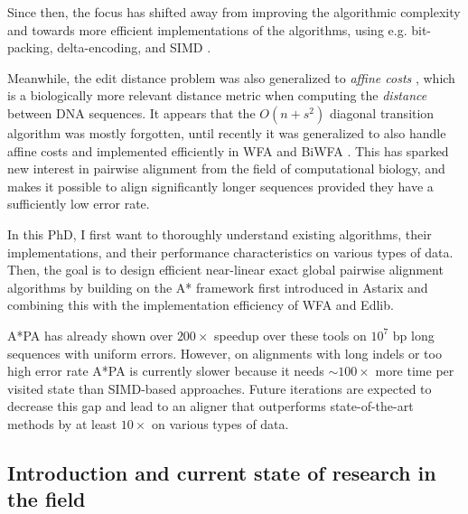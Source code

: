 \documentclass[11pt,english,a4paper]{article}
\begin{document}
Since then, the focus has shifted away from improving the algorithmic complexity
and towards more efficient implementations of the algorithms, using e.g.
bit-packing, delta-encoding, and SIMD
\autocite{myers99,edlib,suzuki-kasahara}.

Meanwhile, the edit distance problem was also generalized to \emph{affine costs}
\autocite{gotoh}, which is a biologically more relevant distance metric when
computing the \emph{distance} between DNA sequences.
It appears that the \(O(n+s^2)\) diagonal transition algorithm was
mostly forgotten, until recently it was generalized to also handle affine costs
and implemented efficiently in WFA and BiWFA \autocite{wfa,biwfa}.
This has sparked new interest in pairwise alignment from the field of
computational biology, and makes it possible to align significantly longer
sequences provided they have a sufficiently low error rate.

In this PhD, I first want to thoroughly understand existing
algorithms, their implementations, and their performance characteristics on
various types of data.
Then, the goal is to design efficient near-linear exact global pairwise alignment
algorithms by building on the A* framework first introduced in Astarix
\autocite{astarix-1,astarix-2} and combining this with the implementation efficiency of
WFA and Edlib.

A*PA has already shown over \(200\times\) speedup over these tools on \(10^7\) bp
long sequences with uniform errors. However, on alignments with long indels or
too high error rate A*PA is currently slower because it needs \(\sim 100\times\)
more time per visited state than SIMD-based approaches. Future iterations are
expected to decrease this gap and lead to an aligner that outperforms
state-of-the-art methods by at least \(10\times\) on various types of data.

\subsection{Introduction and current state of research in the field}
\label{sec:orgecc00e2}
\end{document}
